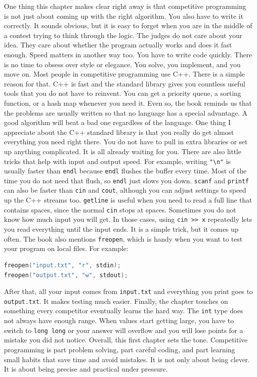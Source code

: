 \documentclass[12pt,letterpaper]{book}
\theoremstyle{definition}
\theoremstyle{remark}
\begin{document}
One thing this chapter makes clear right away is that competitive programming is not just about coming up with the right algorithm. You also have to write it correctly. It sounds obvious, but it is easy to forget when you are in the middle of a contest trying to think through the logic. The judges do not care about your idea. They care about whether the program actually works and does it fast enough.
Speed matters in another way too. You have to write code quickly. There is no time to obsess over style or elegance. You solve, you implement, and you move on.
Most people in competitive programming use C++. There is a simple reason for that. C++ is fast and the standard library gives you countless useful tools that you do not have to reinvent. You can get a priority queue, a sorting function, or a hash map whenever you need it. Even so, the book reminds us that the problems are usually written so that no language has a special advantage. A good algorithm will beat a bad one regardless of the language.
One thing I appreciate about the C++ standard library is that you really do get almost everything you need right there. You do not have to pull in extra libraries or set up anything complicated. It is all already waiting for you.
There are also little tricks that help with input and output speed. For example, writing \texttt{"{\textbackslash}n"} is usually faster than \texttt{endl} because \texttt{endl} flushes the buffer every time. Most of the time you do not need that flush, so \texttt{endl} just slows you down. \texttt{scanf} and \texttt{printf} can also be faster than \texttt{cin} and \texttt{cout}, although you can adjust settings to speed up the C++ streams too. \texttt{getline} is useful when you need to read a full line that contains spaces, since the normal \texttt{cin} stops at spaces.
Sometimes you do not know how much input you will get. In those cases, using \texttt{cin >> x} repeatedly lets you read everything until the input ends. It is a simple trick, but it comes up often.
The book also mentions \texttt{freopen}, which is handy when you want to test your program on local files. For example:
\begin{lstlisting}[language=C++]
freopen("input.txt", "r", stdin);
freopen("output.txt", "w", stdout);
\end{lstlisting}
After that, all your input comes from \texttt{input.txt} and everything you print goes to \texttt{output.txt}. It makes testing much easier.
Finally, the chapter touches on something every competitor eventually learns the hard way. The \texttt{int} type does not always have enough range. When values start getting large, you have to switch to \texttt{long long} or your answer will overflow and you will lose points for a mistake you did not notice.
Overall, this first chapter sets the tone. Competitive programming is part problem solving, part careful coding, and part learning small habits that save time and avoid mistakes. It is not only about being clever. It is about being precise and practical under pressure.
\end{document}
